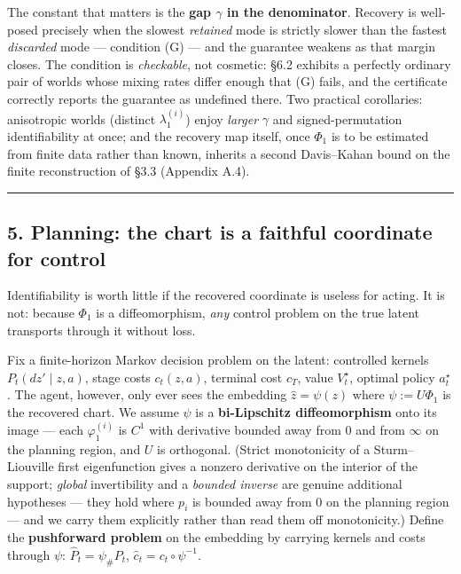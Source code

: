 \documentclass[
  letterpaper,
  11pt]{article}
\theoremstyle{plain}
\theoremstyle{definition}
\theoremstyle{remark}
\begin{document}
The constant that matters is the \textbf{gap \(\gamma\) in the denominator}. Recovery is well-posed precisely when the slowest \emph{retained} mode is strictly slower than the fastest \emph{discarded} mode --- condition (G) --- and the guarantee weakens as that margin closes. The condition is \emph{checkable}, not cosmetic: §6.2 exhibits a perfectly ordinary pair of worlds whose mixing rates differ enough that (G) fails, and the certificate correctly reports the guarantee as undefined there. Two practical corollaries: anisotropic worlds (distinct \(\lambda_1^{(i)}\)) enjoy \emph{larger} \(\gamma\) and signed-permutation identifiability at once; and the recovery map itself, once \(\Phi_1\) is to be estimated from finite data rather than known, inherits a second Davis--Kahan bound on the finite reconstruction of §3.3 (Appendix A.4).

\begin{center}\rule{0.5\linewidth}{0.5pt}\end{center}

\subsection{5. Planning: the chart is a faithful coordinate for control}\label{sec:planning}

Identifiability is worth little if the recovered coordinate is useless for acting. It is not: because \(\Phi_1\) is a diffeomorphism, \emph{any} control problem on the true latent transports through it without loss.

Fix a finite-horizon Markov decision problem on the latent: controlled kernels \(P_t(dz'\mid z,a)\), stage costs \(c_t(z,a)\), terminal cost \(c_T\), value \(V^\star_t\), optimal policy \(a^\star_t\). The agent, however, only ever sees the embedding \(\widehat z=\psi(z)\) where \(\psi:=U\Phi_1\) is the recovered chart. We assume \(\psi\) is a \textbf{bi-Lipschitz diffeomorphism} onto its image --- each \(\varphi_1^{(i)}\) is \(C^1\) with derivative bounded away from \(0\) and from \(\infty\) on the planning region, and \(U\) is orthogonal. (Strict monotonicity of a Sturm--Liouville first eigenfunction gives a nonzero derivative on the interior of the support; \emph{global} invertibility and a \emph{bounded inverse} are genuine additional hypotheses --- they hold where \(p_i\) is bounded away from \(0\) on the planning region --- and we carry them explicitly rather than read them off monotonicity.) Define the \textbf{pushforward problem} on the embedding by carrying kernels and costs through \(\psi\): \(\widehat P_t = \psi_\# P_t\), \(\widehat c_t = c_t\circ\psi^{-1}\).
\end{document}
